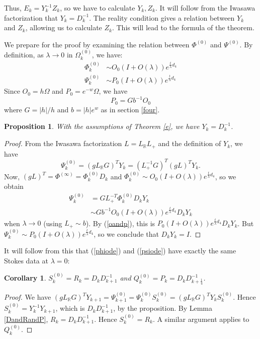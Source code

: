 \documentclass[a4paper,12pt,leqno]{amsart}
\numberwithin{equation}{section}
\theoremstyle{plain}
\newtheorem{proposition}[theorem]{Proposition}
\newtheorem{corollary}[theorem]{Corollary}
\theoremstyle{definition}
\newcommand{\R}{\mathbb R}
\newcommand{\la}{\lambda}
\newcommand{\Om}{\Omega}
\newcommand{\no}{\noindent}
\newcommand{\Psiz}{  \Psi^{(0)}  }
\newcommand{\Sz}{  S^{(0)}  }
\newcommand{\Qz}{  Q^{(0)}  }
\newcommand{\Omz}{  \Om^{(0)}  }
\newcommand{\Phiz}{\Phi^{(0)}}
\newcommand{\Phii}{\Phi^{(\infty)}}
\begin{document}
\no Thus, $E_k=Y_k^{-1}Z_k$, so we have to calculate $Y_k,Z_k$.  It will follow from the Iwasawa factorization 
that $Y_k=D_k^{-1}$.  The reality condition gives a relation between $Y_k$ and $Z_k$, allowing us to calculate $Z_k$. This will lead to the formula of the theorem.  

We prepare for the proof by examining the relation between 
$\Phiz$ and $\Psiz$.   By definition, as $\la\to 0$ in $\Omz_k$, we have:
\begin{align*}
\Phiz_k &\sim  O_0 (I+O(\la) ) e^{\frac t\la d_4}
\\
\Psiz_k &\sim  P_0 (I+O(\la) ) e^{\frac t\la d_4}
\end{align*}
Since $O_0=h\Om$ and $P_0=e^{-w}\Om$, we have
\begin{equation}\label{oandp}
P_0 = G b^{-1} O_0
\end{equation}
where $G=\vert h\vert /h$ and $b=\vert h\vert e^w$ as in section \ref{four}.

\begin{proposition}\label{yandd}
With the assumptions of Theorem \ref{e}, we have
$Y_k=D_k^{-1}$.
\end{proposition}

\begin{proof}  
From the Iwasawa factorization $L=L_\R L_+$ and the definition of $Y_k$, we have
\[
\Psiz_k  =  (g L_\R G)^T Y_k =  (L_+^{-1} G)^T (gL)^T Y_k.
\]
Now, $(gL)^T=\Phii=\Phiz_k D_k$ and 
$\Phiz_k \sim  O_0 (I+O(\la) ) e^{\frac t\la d_4}$, so we obtain
\begin{align*}
\Psiz_k  &= G L_+^{-T} \Phiz_k D_k Y_k
\\
&\sim Gb^{-1} O_0  (I+O(\la) ) e^{\frac t\la d_4} D_k Y_k
\end{align*}
when $\la\to 0$  (using $L_+\sim b$).
By (\ref{oandp}), this is $P_0  (I+O(\la) ) e^{\frac t\la d_4} D_k Y_k$. 
But $\Psiz_k\sim P_0 (I+O(\la) ) e^{\frac t\la d_4}$, 
so we conclude that $D_k Y_k=I$.
\end{proof}

It will follow from this that (\ref{phiode}) and (\ref{psiode}) have exactly the same Stokes data at $\la=0$:

\begin{corollary}\label{sandr}
$\Sz_k=R_k=D_kD_{k+1}^{-1}$ and $\Qz_k=P_k=D_kD_{k+\frac14}^{-1}$.
\end{corollary}

\begin{proof}
We have $(gL_\R G)^T Y_{k+1} = \Psiz_{k+1} = \Psiz_k \Sz_k =
(gL_\R G)^T Y_k \Sz_k$.  Hence $\Sz_k=Y_k^{-1}Y_{k+1}$, which is $D_k D_{k+1}^{-1}$, by the proposition.  By Lemma \ref{DandRandP},
$R_k=D_k D_{k+1}^{-1}$.  Hence  $\Sz_k=R_k$.  
A similar argument applies to $\Qz_k$.
\end{proof}
\end{document}
